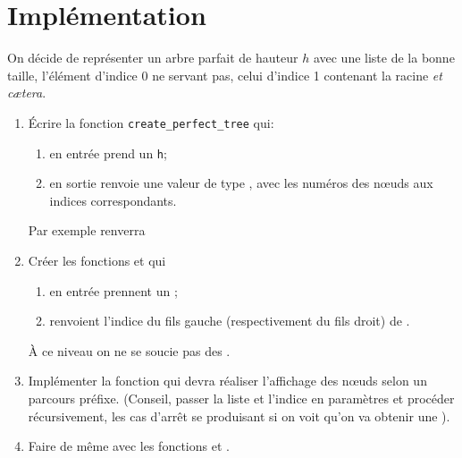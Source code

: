 \documentclass[a4paper,12pt,french]{book}
\begin{document}
    \section*{Implémentation}

    On décide de représenter un arbre parfait de hauteur $h$ avec une liste de la bonne taille, l'élément d'indice 0 ne servant pas, celui d'indice 1 contenant la racine \textit{et c\ae tera}.\\

    \begin{enumerate}[\bfseries 1.]
        \item \'Ecrire la fonction \texttt{create\_perfect\_tree} qui:
        \begin{enumerate}[--]
            \item en entrée prend un  \texttt{h};
            \item en sortie renvoie une valeur de type , avec les numéros des n\oe uds aux indices correspondants.
        \end{enumerate}
        Par exemple  renverra \pythoninline{[None, 1, 2, 3, 4, 5, 6, 7]}
        \item Créer les fonctions  et  qui
        \begin{enumerate}[--]
            \item en entrée prennent un ;
            \item renvoient l'indice du fils gauche (respectivement du fils droit) de .
        \end{enumerate}
        À ce niveau on ne se soucie pas des .
        \item Implémenter la fonction  qui devra réaliser l'affichage des n\oe uds selon un parcours préfixe. (Conseil, passer la liste et l'indice en paramètres et procéder récursivement, les cas d'arrêt se produisant si on voit qu'on va obtenir une ).
        \item Faire de même avec les fonctions  et .
    \end{enumerate}
\end{document}
